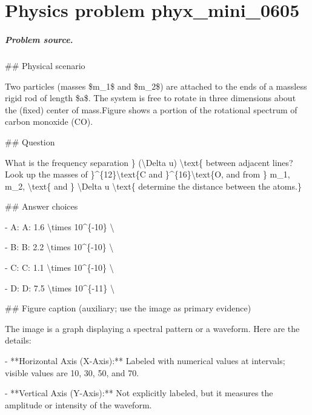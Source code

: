 
\chapter{Physics problem phyx\_mini\_0605}
\label{ch:PhyXMiniProblems_problem_phyx_mini_0605}

\paragraph{Problem source.}
\#\# Physical scenario

Two particles (masses \$m\_1\$ and \$m\_2\$) are attached to the ends of a massless rigid rod of length \$a\$. The system is free to rotate in three dimensions about the (fixed) center of mass.Figure shows a portion of the rotational spectrum of carbon monoxide (CO).

\#\# Question

What is the frequency separation \} (\textbackslash{}Delta 
u) \textbackslash{}text\{ between adjacent lines? Look up the masses of \}\textasciicircum{}\{12\}\textbackslash{}text\{C and \}\textasciicircum{}\{16\}\textbackslash{}text\{O, and from \} m\_1, m\_2, \textbackslash{}text\{ and \} \textbackslash{}Delta 
u \textbackslash{}text\{ determine the distance between the atoms.\}

\#\# Answer choices

- A: A: 1.6 \textbackslash{}times 10\textasciicircum{}\{-10\} \textbackslash{}

- B: B: 2.2 \textbackslash{}times 10\textasciicircum{}\{-10\} \textbackslash{}

- C: C: 1.1 \textbackslash{}times 10\textasciicircum{}\{-10\} \textbackslash{}

- D: D: 7.5 \textbackslash{}times 10\textasciicircum{}\{-11\} \textbackslash{}

\#\# Figure caption (auxiliary; use the image as primary evidence)

The image is a graph displaying a spectral pattern or a waveform. Here are the details:

- **Horizontal Axis (X-Axis):** Labeled with numerical values at intervals; visible values are 10, 30, 50, and 70.
  
- **Vertical Axis (Y-Axis):** Not explicitly labeled, but it measures the amplitude or intensity of the waveform.

